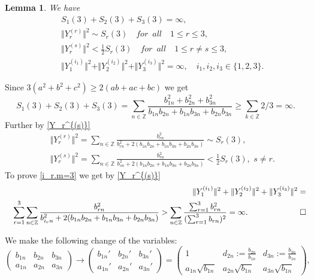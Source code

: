 \documentclass[preprint,12pt]{elsarticle}
\newcommand{\commA}[1]{\marginpar{%
\begin{color}{red}
\vskip-\baselineskip %
\raggedright\footnotesize
\itshape\hrule \smallskip A: #1\par\smallskip\hrule\end{color}}}
\newtheorem{lem}[thm]{Lemma}
\numberwithin{equation}{section}
\begin{document}
%
\begin{lem}
\label{l.S1+S2+S3.m=3}
We have 
\begin{eqnarray}
 \label{S1+S2+S3}
&& S_1(3)+S_2(3)+S_3(3)=\infty,\\
\label{Yr-sim-Sr}
&& \Vert Y_r^{(r)}\Vert^2\sim S_r(3)\quad{for\,\,\, all}\quad 1\leq r\leq 3,\\
\label{Yr^s-<-Sr}
&& \Vert Y_r^{(s)}\Vert^2< \frac{1}{2}S_r(3)\quad{for\,\,\, all}\quad 1\leq r\not=s\leq 3,\\
\label{i_r.m=3} 
&&
\Vert Y_1^{(i_1)}\Vert^2+\Vert Y_2^{(i_2)}\Vert^2+\Vert Y_3^{(i_3)}\Vert^2=\infty,\quad 
i_1,i_2,i_3\in \{1,2,3\}.
\end{eqnarray}
\end{lem}
%
\begin{pf} Since $3(a^2+b^2+c^2)\geq 2(ab+ac+bc)$ we get 
 \begin{equation*}
  S_1(3)+S_2(3)+S_3(3)=\sum_{n\in \mathbb Z}\frac{b_{1n}^2+b_{2n}^2+b_{3n}^2}{b_{1n}b_{2n}+b_{1n}b_{3n}+b_{2n}b_{3n}}\geq\sum_{k\in \mathbb Z}2/3=\infty.
\end{equation*}
Further by \eqref{Y_r^{(s)}}
\begin{eqnarray*}
&& \Vert Y_r^{(r)}\Vert^2 =\sum_{n\in \mathbb Z}\frac{b_{rn}^2}{b_{rn}^2+2(b_{1n}b_{2n}+b_{1n}b_{3n}+b_{2n}b_{3n})}\sim S_r(3),\\
&& \Vert Y_r^{(s)}\Vert^2 =\sum_{n\in \mathbb Z}\frac{b_{rn}^2}{b_{sn}^2+2(b_{1n}b_{2n}+b_{1n}b_{3n}+b_{2n}b_{3n})}<\frac{1}{2} S_r(3),\,\,s\not=r.
\end{eqnarray*}
To prove \eqref{i_r.m=3} we get by \eqref{Y_r^{(s)}} 
\begin{eqnarray*}
&&\Vert Y_1^{(i_1)}\Vert^2+\Vert Y_2^{(i_2)}\Vert^2+\Vert Y_3^{(i_3)}\Vert^2=\\
&&
\sum_{r=1}^3\sum_{n\in \mathbb Z}\frac{b_{rn}^2}
{b_{i_rn}^2+2(b_{1n}b_{2n}+b_{1n}b_{3n}+b_{2n}b_{3n})}
>
\sum_{n\in \mathbb Z}\frac{\sum_{r=1}^3b_{rn}^2}{(\sum_{r=1}^3b_{rn})^2}=\infty.\hskip 2.3cm\Box
\end{eqnarray*}
\end{pf}
%
We make the following change of the variables:
\begin{equation}
 \label{(b,a)-(b',a')}
\left(\begin{smallmatrix}
b_{1n}&b_{2n}&b_{3n}\\
a_{1n}&a_{2n}&a_{3n}
\end{smallmatrix}
\right)\to
\left(\begin{smallmatrix}
b_{1n}'&b_{2n}'&b_{3n}'\\
a_{1n}'&a_{2n}'&a_{3n}'
\end{smallmatrix}
\right)=
%
\left(\begin{smallmatrix}
1&d_{2n}:=\frac{b_{2n}}{b_{1n}}&d_{3n}:=\frac{b_{3n}}{b_{1n}}\\
a_{1n}\sqrt{b_{1n}}&a_{2n}\sqrt{b_{1n}}&a_{3n}\sqrt{b_{1n}}
\end{smallmatrix}
\right),
\end{equation}
\end{document}
